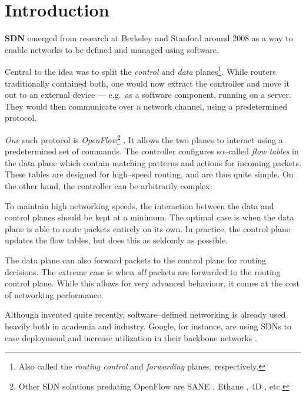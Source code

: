 \chapter{Introduction}

\textbf{\acf{SDN}} \cite{Casado:2005:VNS:1047344.1047383} emerged from
research at Berkeley and Stanford around 2008 as a way to enable networks to
be defined and managed using software.

Central to the idea was to split the {\em control} and {\em data}
planes\footnote{Also called the {\em routing control} and {\em forwarding}
planes, respectively.}.
%
While routers traditionally contained both, one would now extract the
controller and move it out to an external device --- e.g.~as a software
component, running on a server.  They would then communicate over a network
channel, using a predetermined protocol.

{\em One} such protocol is {\em OpenFlow}\footnote{Other
\ac{SDN} solutions predating OpenFlow are SANE
\cite{Casado:2006:SPA:1267336.1267346}, Ethane
\cite{Casado:2007:ETC:1282427.1282382}, 4D
\cite{Greenberg:2005:CSA:1096536.1096541}, etc.}
\cite{McKeown:2008:OEI:1355734.1355746}.  It allows the two planes to
interact using a predetermined set of commands.  The controller configures
so--called {\em flow tables} in the data plane  which contain matching patterns and actions for incoming packets.
These tables are designed for high--speed routing, and are thus quite
simple.  On the other hand, the controller can be arbitrarily complex.

To maintain high networking speeds, the interaction between the data and
control planes should be kept at a minimum.  The optimal case is when the
data plane is able to route packets entirely on its own.  In practice, the
control plane updates the flow tables, but does this as seldomly as
possible.

The data plane can also forward packets to the control plane for routing decisions. The extreme case is when {\em all} packets are
forwarded to the routing control plane.  While this allows for very advanced
behaviour, it comes at the cost of networking performance.

Although invented quite recently, software--defined networking is already
used heavily both in academia and industry.  Google, for instance, are using
\acp{SDN} to ease deploymend and increase utilization in their backbone
networks \cite{crabbe2012sdn}.


